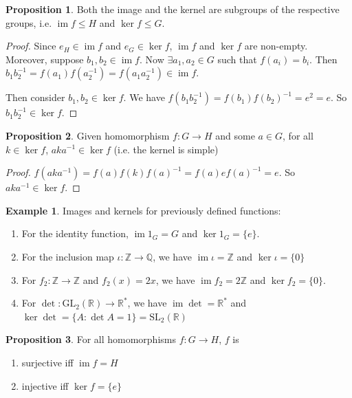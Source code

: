 \documentclass[a4paper]{article}
\theoremstyle{definition}
\newtheorem*{prop}{Proposition}
\newtheorem*{eg}{Example}
\newcommand{\Z}{\mathbb{Z}}
\newcommand{\Q}{\mathbb{Q}}
\newcommand{\R}{\mathbb{R}}
\newcommand{\GL}{\mathrm{GL}}
\DeclareMathOperator\im{im}
\begin{document}
\begin{prop}
  Both the image and the kernel are subgroups of the respective groups, i.e. $\im f\leq H$ and $\ker f \leq G$.
\end{prop}

\begin{proof}
  Since $e_H\in \im f$ and $e_G\in \ker f$, $\im f$ and $\ker f$ are non-empty. Moreover, suppose $b_1, b_2\in \im f$. Now $\exists a_1, a_2 \in G$ such that $f(a_i) = b_i$. Then $b_1b_2^{-1} = f(a_1)f(a_2^{-1}) = f(a_1a_2^{-1})\in \im f$. 

  Then consider $b_1,b_2\in \ker f$. We have $f(b_1b_2^{-1}) = f(b_1)f(b_2)^{-1} = e^2 = e$. So $b_1b_2^{-1}\in \ker f$.
\end{proof}

\begin{prop}
  Given homomorphism $f:G\rightarrow H$ and some $a\in G$, for all $k\in \ker f$, $aka^{-1}\in\ker f$ (i.e. the kernel is simple)
\end{prop}

\begin{proof}
  $f(aka^{-1}) = f(a)f(k)f(a)^{-1} = f(a)ef(a)^{-1} = e$. So $aka^{-1}\in \ker f$.
\end{proof}

\begin{eg}
  Images and kernels for previously defined functions:
  \begin{enumerate}
    \item For the identity function, $\im 1_G = G$ and $\ker 1_G = \{e\}$.
    \item For the inclusion map $\iota: \Z\rightarrow\Q$, we have $\im \iota = \Z$ and $\ker \iota = \{0\}$
    \item For $f_2:\Z\rightarrow\Z$ and $f_2(x) = 2x$, we have $\im f_2 = 2\Z$ and $\ker f_2 = \{0\}$.
    \item For $\det: \GL_2(\R) \rightarrow \R^*$, we have $\im \det = \R^*$ and $\ker \det = \{A:\det A = 1\} = \mathrm{SL}_2(\R)$
  \end{enumerate}
\end{eg}
\begin{prop}
  For all homomorphisms $f:G\rightarrow H$, $f$ is
  \begin{enumerate}
    \item surjective iff $\im f = H$
    \item injective iff $\ker f = \{e\}$
  \end{enumerate}
\end{prop}
\end{document}
